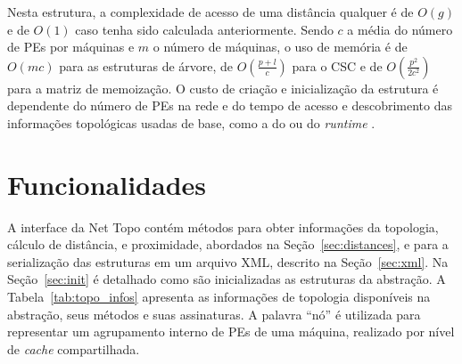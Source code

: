 Nesta estrutura, a complexidade de acesso de uma distância qualquer é de $O(g)$ e de $O(1)$ caso tenha sido calculada anteriormente.
Sendo $c$ a média do número de PEs por máquinas e $m$ o número de máquinas, o uso de memória é de $O(mc)$ para as estruturas de árvore, de $O(\frac{p+l}{c})$ para o CSC e de $O(\frac{p^2}{2c^2})$ para a matriz de memoização.
O custo de criação e inicialização da estrutura é dependente do número de PEs na rede e do tempo de acesso e descobrimento das informações topológicas usadas de base, como a do \hwloc ou do \textit{runtime} \charm.



\section{Funcionalidades}
\label{sec:func}

A interface da Net Topo contém métodos para obter informações da topologia, cálculo de distância, \hops e proximidade, abordados na Seção~\ref{sec:distances}, e para a serialização das estruturas em um arquivo XML, descrito na Seção~\ref{sec:xml}.
Na Seção~\ref{sec:init} é detalhado como são inicializadas as estruturas da abstração.
A Tabela~\ref{tab:topo_infos} apresenta as informações de topologia disponíveis na abstração, seus métodos e suas assinaturas.
A palavra ``nó'' é utilizada para representar um agrupamento interno de PEs de uma máquina, realizado por nível de \textit{cache} compartilhada.

